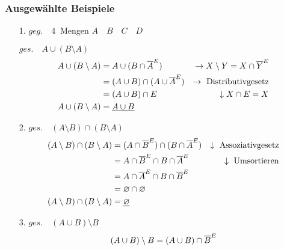             \subsubsection{Ausgewählte Beispiele}
                \begin{itemize}
                    \item[1.] $geg.\quad 4~$ Mengen $A \quad B \quad C \quad D$
                    \item[]   $ges.\quad A \cup (B \setminus A)$
                        \begin{align*}
                            A \cup (B \setminus A) & =A \cup (B \cap \overline{A}^E) & \rightarrow X \setminus Y = X \cap \overline{Y}^E \\
                                                   & =(A \cup B) \cap (A \cup \overline{A}^E)& \rightarrow \text{~Distributivgesetz}\\
                                                   & =(A \cup B) \cap E & \downarrow X \cap E = X \\
                            A \cup (B \setminus A) & =\underline{A \cup B} &\\
                        \end{align*}
                    \item[2.]  $ges.\quad (A \setminus B) \cap (B \setminus A)$
                        \begin{align*}
                                (A \setminus B) \cap (B \setminus A) & = (A \cap \overline{B}^E) \cap (B \cap \overline{A}^E) & \downarrow \text{~Assoziativgesetz} \\
                                & = A \cap \overline{B}^E \cap B \cap \overline{A}^E & \downarrow \text{~Umsortieren} \\
                                & = A \cap \overline{A}^E \cap B \cap \overline{B}^E & \\
                                & = \varnothing \cap \varnothing & \\
                                (A \setminus B) \cap (B \setminus A) & = \underline{\varnothing} & \\
                        \end{align*}
                    \item[3.] $ges.\quad (A \cup B) \setminus B$ %
                        \begin{align*}
                            (A \cup B) \setminus B & = (A \cup B) \cap \komplement{B} \\

\end{align*}
\end{itemize}
